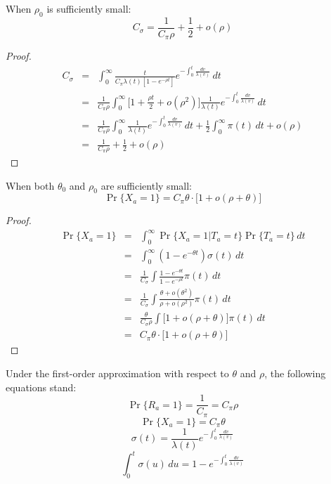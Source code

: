 \documentclass[pdftex,10pt]{article}
\begin{document}
\begin{cor}\label{cor:sigma}
  When $\rho_0$ is sufficiently small:
  \begin{equation}
    C_{\sigma}=\frac{1}{C_{\pi}\rho}+\frac{1}{2}+o(\rho)
  \end{equation}
\end{cor}
\begin{proof}
  \begin{eqnarray*}
  C_{\sigma}&=&\int_0^{\infty}\frac{t}{C_{\pi}\lambda(t)[1-e^{-\rho t}]}e^{-\int_0^t\frac{dv}{\lambda(v)}}\,dt\\
  &=&\frac{1}{C_{\pi}\rho}\int_0^{\infty}\Big[1+\frac{\rho t}{2}+o(\rho^2)\Big]
  \frac{1}{\lambda(t)}e^{-\int_0^t\frac{dv}{\lambda(v)}}\,dt\\
  &=&\frac{1}{C_{\pi}\rho}\int_0^{\infty}\frac{1}{\lambda(t)}e^{-\int_0^t\frac{dv}{\lambda(v)}}\,dt
  +\frac{1}{2}\int_0^{\infty}\pi(t)\,dt+o(\rho)\\
  &=&\frac{1}{C_{\pi}\rho}+\frac{1}{2}+o(\rho)
  \end{eqnarray*}
\end{proof}

\begin{cor}\label{cor:theta}
  When both $\theta_0$ and $\rho_0$ are sufficiently small:
  \begin{equation}\label{equ:theta}
    \Pr\{X_a=1\}=C_{\pi}\theta\cdot\big[1+o(\rho+\theta)\big]
  \end{equation}
\end{cor}
\begin{proof}
  \begin{eqnarray*}
    \Pr\{X_a=1\}&=&\int_0^{\infty}\Pr\{X_a=1|T_a=t\}\Pr\{T_a=t\}\,dt\\
    &=&\int_0^{\infty}(1-e^{-\theta t})\sigma(t)\,dt\\
    &=&\frac{1}{C_{\sigma}}\int\frac{1-e^{-\theta t}}{1-e^{-\rho t}}\pi(t)\,dt\\
    &=&\frac{1}{C_{\sigma}}\int\frac{\theta+o(\theta^2)}{\rho+o(\rho^2)}\pi(t)\,dt\\
    &=&\frac{\theta}{C_{\sigma}\rho}\int\Big[1+o(\rho+\theta)\Big]\pi(t)\,dt\\
    &=&C_{\pi}\theta\cdot\big[1+o(\rho+\theta)\big]
  \end{eqnarray*}
\end{proof}

\begin{cor}
  Under the first-order approximation with respect to $\theta$ and
  $\rho$, the following equations stand:
  \[
  \Pr\{R_a=1\}=\frac{1}{C_{\pi}}=C_{\pi}\rho
  \]
  \[
  \Pr\{X_a=1\}=C_{\pi}\theta
  \]
  \[
  \sigma(t)=\frac{1}{\lambda(t)}e^{-\int_0^t\frac{dv}{\lambda(v)}}
  \]
  \[
  \int_0^t\sigma(u)\,du=1-e^{-\int_0^t\frac{dv}{\lambda(v)}}
  \]
\end{cor}
\end{document}
